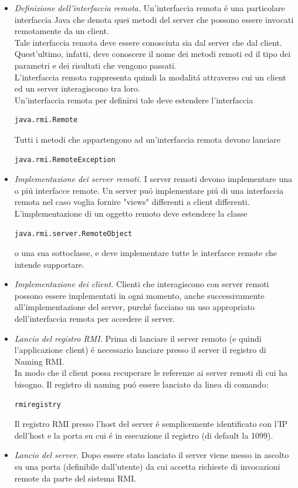 \documentclass[a4paper, 12 pt, italian]{report}
\begin{document}
\begin{itemize}

\item \textit{Definizione dell'interfaccia remota.} Un'interfaccia remota \'e una particolare interfaccia Java che denota quei metodi del server che possono essere invocati remotamente da un client. \\
Tale interfaccia remota deve essere conosciuta sia dal server che dal client. Quest'ultimo, infatti, deve conoscere il nome dei metodi remoti ed il tipo dei parametri e dei risultati che vengono passati. \\
L'interfaccia remota rappresenta quindi la modalit\'a attraverso cui un client ed un server interagiscono tra loro.\\
Un'interfaccia remota per definirsi tale deve estendere l'interfaccia 
\begin{verbatim}
java.rmi.Remote 
\end{verbatim}
Tutti i metodi che appartengono ad un'interfaccia remota devono lanciare 
\begin{verbatim}
java.rmi.RemoteException
\end{verbatim}
\item \textit{Implementazione dei server remoti.} I server remoti devono implementare una o pi\'u interfacce remote. Un server pu\'o implementare pi\'u di una interfaccia remota nel caso voglia fornire "views" differenti a client differenti.
L'implementazione di un oggetto remoto deve estendere la classe 
\begin{verbatim}
java.rmi.server.RemoteObject
\end{verbatim}
o una sua sottoclasse, e deve implementare tutte le interfacce remote che intende supportare.


\item \textit{Implementazione dei client.} Clienti che interagiscono con server remoti possono essere implementati in ogni momento, anche successivamente all'implementazione del server, purch\'e facciano un uso appropriato dell'interfaccia remota per accedere il server.

\item \textit{Lancio del registro RMI.} Prima di lanciare il server remoto (e quindi l'applicazione client) \'e necessario lanciare presso il server il registro di Naming RMI. \\
In modo che il client possa recuperare le referenze ai server remoti di cui ha bisogno.
Il registro di naming pu\'o essere lanciato da linea di comando:
\begin{verbatim}
rmiregistry
\end{verbatim}
Il registro RMI presso l'host del server \'e semplicemente identificato con l'IP dell'host e la porta su cui \'e in esecuzione il registro (di default la 1099).
\item \textit{Lancio del server.} Dopo essere stato lanciato il server viene messo in ascolto su una porta (definibile dall'utente) da cui accetta richieste di invocazioni remote da parte del sistema RMI. 


\end{itemize}
\end{document}

